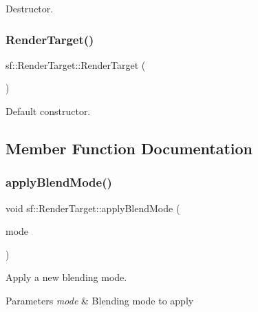 Destructor. 

\begin{DoxyVerb}\end{DoxyVerb}
 \mbox{\label{classsf_1_1_render_target_a2997c96cbd93cb8ce0aba2ddae35b86f}} 
\subsubsection{\texorpdfstring{RenderTarget()}{RenderTarget()}}
{\footnotesize\ttfamily sf\+::\+Render\+Target\+::\+Render\+Target (\begin{DoxyParamCaption}{ }\end{DoxyParamCaption})\hspace{0.3cm}{\ttfamily [protected]}}



Default constructor. 

\begin{DoxyVerb}\end{DoxyVerb}
 

\subsection{Member Function Documentation}
\mbox{\label{classsf_1_1_render_target_ac1e4b4f29386768a626233f14b6eb745}} 
\subsubsection{\texorpdfstring{applyBlendMode()}{applyBlendMode()}}
{\footnotesize\ttfamily void sf\+::\+Render\+Target\+::apply\+Blend\+Mode (\begin{DoxyParamCaption}\item[{const \mbox{\hyperlink{structsf_1_1_blend_mode}{Blend\+Mode}} \&}]{mode }\end{DoxyParamCaption})\hspace{0.3cm}{\ttfamily [private]}}



Apply a new blending mode. 


\begin{DoxyParams}{Parameters}
{\em mode} & Blending mode to apply \begin{DoxyVerb}\end{DoxyVerb}
 \\
\hline
\end{DoxyParams}
\mbox{\label{classsf_1_1_render_target_a3ed439c5445e9c7d7ff786ff37005efa}} 

